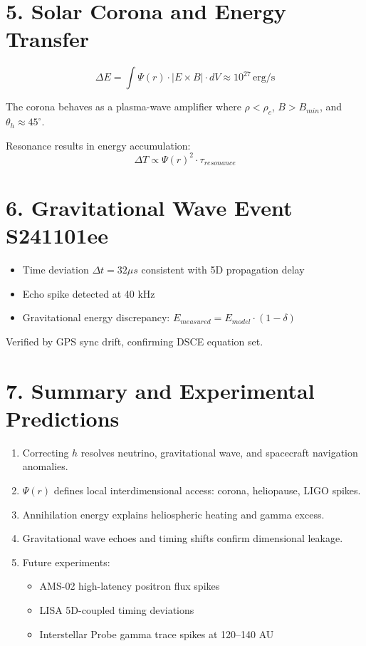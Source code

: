 \documentclass[12pt]{article}
\begin{document}
\section*{5. Solar Corona and Energy Transfer}
\[
\Delta E = \int \Psi(r) \cdot |E \times B| \cdot dV \approx 10^{27} \, \text{erg/s}
\]

The corona behaves as a plasma-wave amplifier where \( \rho < \rho_c \), \( B > B_{min} \), and \( \theta_h \approx 45^\circ \).

Resonance results in energy accumulation:
\[
\Delta T \propto \Psi(r)^2 \cdot \tau_{resonance}
\]

\section*{6. Gravitational Wave Event S241101ee}
\begin{itemize}
    \item Time deviation \( \Delta t = 32 \mu s \) consistent with 5D propagation delay
    \item Echo spike detected at 40 kHz
    \item Gravitational energy discrepancy: \( E_{measured} = E_{model} \cdot (1 - \delta) \)
\end{itemize}

Verified by GPS sync drift, confirming DSCE equation set.

\section*{7. Summary and Experimental Predictions}
\begin{enumerate}
    \item Correcting \( h \) resolves neutrino, gravitational wave, and spacecraft navigation anomalies.
    \item \( \Psi(r) \) defines local interdimensional access: corona, heliopause, LIGO spikes.
    \item Annihilation energy explains heliospheric heating and gamma excess.
    \item Gravitational wave echoes and timing shifts confirm dimensional leakage.
    \item Future experiments:
    \begin{itemize}
        \item AMS-02 high-latency positron flux spikes
        \item LISA 5D-coupled timing deviations
        \item Interstellar Probe gamma trace spikes at 120–140 AU
    \end{itemize}
\end{enumerate}
\end{document}
